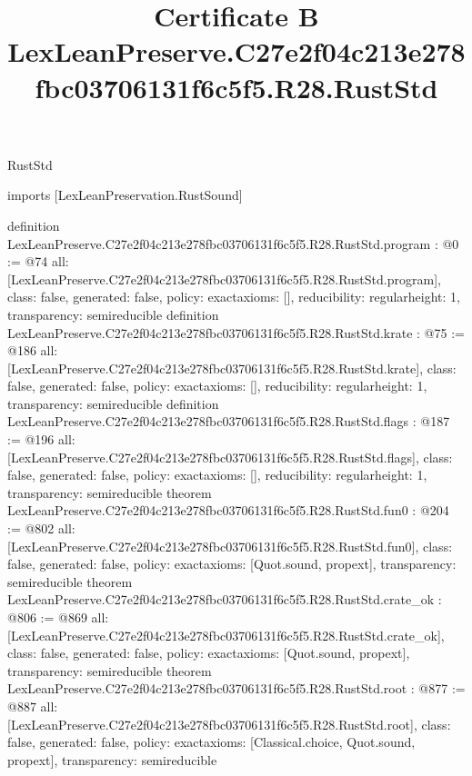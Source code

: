 \begin{lexlean}{RustStd}
\title{Certificate B LexLeanPreserve.C27e2f04c213e278fbc03706131f6c5f5.R28.RustStd}
\begin{coremodule}
imports [LexLeanPreservation.RustSound]

definition LexLeanPreserve.C27e2f04c213e278fbc03706131f6c5f5.R28.RustStd.program : @0 := @74 {
  all: [LexLeanPreserve.C27e2f04c213e278fbc03706131f6c5f5.R28.RustStd.program],
  class: false,
  generated: false,
  policy: exact{axioms: []},
  reducibility: regular{height: 1},
  transparency: semireducible
}
definition LexLeanPreserve.C27e2f04c213e278fbc03706131f6c5f5.R28.RustStd.krate : @75 := @186 {
  all: [LexLeanPreserve.C27e2f04c213e278fbc03706131f6c5f5.R28.RustStd.krate],
  class: false,
  generated: false,
  policy: exact{axioms: []},
  reducibility: regular{height: 1},
  transparency: semireducible
}
definition LexLeanPreserve.C27e2f04c213e278fbc03706131f6c5f5.R28.RustStd.flags : @187 := @196 {
  all: [LexLeanPreserve.C27e2f04c213e278fbc03706131f6c5f5.R28.RustStd.flags],
  class: false,
  generated: false,
  policy: exact{axioms: []},
  reducibility: regular{height: 1},
  transparency: semireducible
}
theorem LexLeanPreserve.C27e2f04c213e278fbc03706131f6c5f5.R28.RustStd.fun0 : @204 := @802 {
  all: [LexLeanPreserve.C27e2f04c213e278fbc03706131f6c5f5.R28.RustStd.fun0],
  class: false,
  generated: false,
  policy: exact{axioms: [Quot.sound, propext]},
  transparency: semireducible
}
theorem LexLeanPreserve.C27e2f04c213e278fbc03706131f6c5f5.R28.RustStd.crate_ok : @806 := @869 {
  all: [LexLeanPreserve.C27e2f04c213e278fbc03706131f6c5f5.R28.RustStd.crate_ok],
  class: false,
  generated: false,
  policy: exact{axioms: [Quot.sound, propext]},
  transparency: semireducible
}
theorem LexLeanPreserve.C27e2f04c213e278fbc03706131f6c5f5.R28.RustStd.root : @877 := @887 {
  all: [LexLeanPreserve.C27e2f04c213e278fbc03706131f6c5f5.R28.RustStd.root],
  class: false,
  generated: false,
  policy: exact{axioms: [Classical.choice, Quot.sound, propext]},
  transparency: semireducible
}


\end{coremodule}
\end{lexlean}
